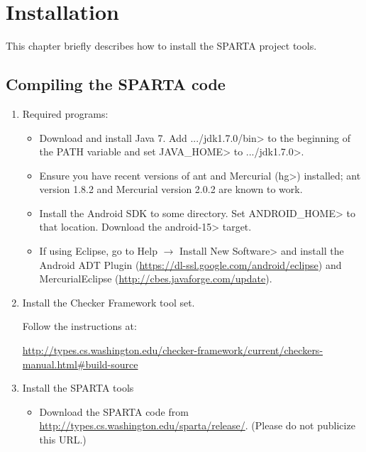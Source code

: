 \htmlhr
\chapter{Installation\label{installation}}

This chapter briefly describes how to install the SPARTA project tools.

\section{Compiling the SPARTA code}

\begin{enumerate}

\item Required programs:

\begin{itemize}
\item Download and install Java 7. Add \<.../jdk1.7.0/bin> to the
  beginning of the PATH variable and set \<JAVA\_HOME> to
  \<.../jdk1.7.0>.

\item Ensure you have recent versions of ant and Mercurial (\<hg>) installed;
  ant version 1.8.2 and Mercurial version 2.0.2 are known to work.

\item Install the Android SDK to some directory. Set \<ANDROID\_HOME> to that
  location.
  Download the \<android-15> target.

\item If using Eclipse, go to
\<Help $\rightarrow$ Install New Software>
and install the Android ADT Plugin (\url{https://dl-ssl.google.com/android/eclipse}) and MercurialEclipse (\url{http://cbes.javaforge.com/update}).

\end{itemize}


\item Install the Checker Framework tool set.

Follow the instructions at:

\url{http://types.cs.washington.edu/checker-framework/current/checkers-manual.html#build-source}


\item
Install the SPARTA tools

\begin{itemize}
\item
 Download the SPARTA code from \url{http://types.cs.washington.edu/sparta/release/}.
(Please do not publicize this URL.)


\end{itemize}
\end{enumerate}
